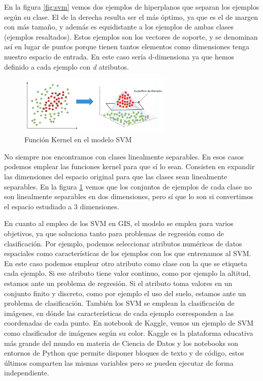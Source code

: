 En la figura \ref{fig:svm} vemos dos ejemplos de hiperplanos que separan los ejemplos según su clase. El de la derecha resulta ser el más óptimo, ya que es el de margen con más tamaño, 
y además es equidistante a los ejemplos de ambas clases (ejemplos resaltados). Estos ejemplos son los vectores de soporte,
y se denominan así en lugar de puntos porque tienen tantos elementos como dimensiones tenga nuestro espacio de entrada.
En este caso sería d-dimensiona ya que hemos definido a cada ejemplo con \textit{d} atributos.

\begin{figure}[H]
    \centering
    \includegraphics[width=0.65\textwidth]{Imagenes/GeoAI/kernel-SVM.png}
    \caption{Función Kernel en el modelo SVM} \label{fig:kernel-svm}
\end{figure}

No siempre nos encontramos con clases linealmente separables. 
En esos casos podemos emplear las funciones kernel para que sí lo sean.
Consisten en expandir las dimensiones del espacio original para que las clases sean linealmente separables.
En la figura \ref{fig:kernel-svm} vemos que los conjuntos de ejemplos de cada clase no son linealmente separables en dos dimensiones, pero sí que lo son si convertimos el espacio estudiado a 3 dimensiones.

En cuanto al empleo de los SVM en GIS, el modelo se emplea para varios objetivos, ya que soluciona tanto para problemas de regresión como de clasificación.
Por ejemplo, podemos seleccionar atributos numéricos de datos espaciales como características de los ejemplos con los que entrenamos al SVM.
En este caso podemos emplear otro atributo como clase con la que se etiqueta cada ejemplo.
Si ese atributo tiene valor continuo, como por ejemplo la altitud, estamos ante un problema de regresión.
Si el atributo toma valores en un conjunto finito y discreto, como por ejemplo el uso del suelo, estamos ante un problema de clasificación.
También los SVM se emplean la clasificación de imágenes, en dónde las características de cada ejemplo corresponden a las coordenadas de cada punto.
En notebook \cite{Kaggle} de Kaggle, vemos un ejemplo de SVM como clasificador de imágenes según su color.
Kaggle es la plataforma educativa más grande del mundo en materia de Ciencia de Datos 
y los notebooks son entornos de Python que permite disponer bloques de texto y de código, estos últimos comparten las mismas variables pero se pueden ejecutar de forma independiente.

